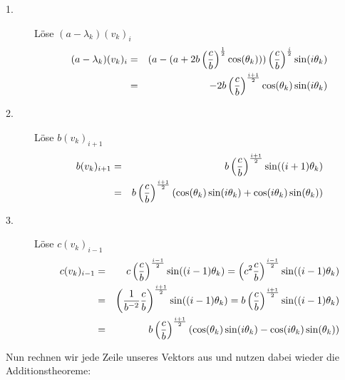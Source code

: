 \begin{description}
\item[1.] Löse $(a - \lambda_{k}) (v_{k})_{i}$
\begin{eqnarray}
(a - \lambda_{k}) (v_{k})_{i} &=& (a - (a + 2b\left(\frac{c}{b}\right)^{\frac{1}{2}} \cos(\theta_{k}))) \left(\frac{c}{b}\right)^{\frac{i}{2}} \sin(i \theta_{k})\notag \\
&=& -2b\left(\frac{c}{b}\right)^{\frac{i+1}{2}} \cos(\theta_{k})\sin(i \theta_{k}) \notag
\end{eqnarray}
\item[2.] Löse $b (v_{k})_{i+1}$
\begin{eqnarray}
b (v_{k})_{i+1} &=& b \left(\frac{c}{b}\right)^{\frac{i+1}{2}} \sin((i+1) \theta_{k})\notag \\
&=& b \left(\frac{c}{b}\right)^{\frac{i+1}{2}} (\cos(\theta_{k}) \sin(i \theta_{k}) + \cos(i \theta_{k}) \sin(\theta_{k})) \notag
\end{eqnarray}
\item[3.] Löse $c (v_{k})_{i-1}$
\begin{eqnarray}
c (v_{k})_{i-1} &=& c \left(\frac{c}{b}\right)^{\frac{i-1}{2}} \sin((i-1) \theta_{k}) = \left(c^{2}\frac{c}{b}\right)^{\frac{i-1}{2}} \sin((i-1) \theta_{k})\notag \\
&=& \left(\frac{1}{b^{-2}} \frac{c}{b}\right)^{\frac{i+1}{2}} \sin((i-1) \theta_{k}) = b \left(\frac{c}{b}\right)^{\frac{i+1}{2}} \sin((i-1) \theta_{k}) \notag \\
&=& b \left(\frac{c}{b}\right)^{\frac{i+1}{2}} (\cos(\theta_{k}) \sin(i \theta_{k}) - \cos(i \theta_{k}) \sin(\theta_{k})) \notag
\end{eqnarray}
\end{description}

Nun rechnen wir jede Zeile unseres Vektors aus und nutzen dabei wieder die Additionstheoreme:

